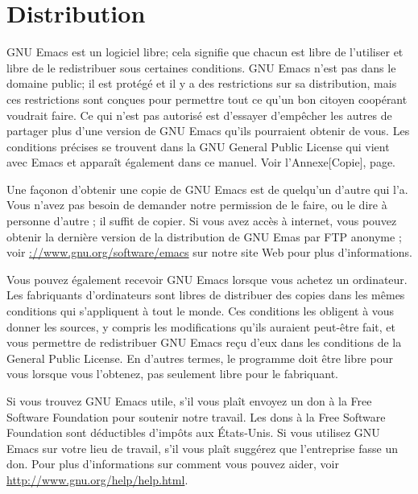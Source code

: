 {}
\section*{Distribution}\label{distribution}
GNU Emacs est un logiciel libre; cela signifie que chacun est libre de
l'utiliser et libre de le redistribuer sous certaines conditions. GNU
Emacs n'est pas dans le domaine public; il est protégé et il y a des
restrictions sur sa distribution, mais ces restrictions sont conçues
pour permettre tout ce qu'un bon citoyen coopérant voudrait faire. Ce
qui n'est pas autorisé est d'essayer d'empêcher les autres de partager
plus d'une version de GNU Emacs qu'ils pourraient obtenir de vous. Les
conditions précises se trouvent dans la GNU General Public License qui
vient avec Emacs et apparaît également dans ce manuel. Voir
l'Annexe[Copie], page.\par 

Une façonon d'obtenir une copie de GNU Emacs est de quelqu'un d'autre
qui l'a. Vous n'avez pas besoin de demander notre permission de le
faire, ou le dire à personne d'autre ; il suffit de copier. Si vous
avez accès à internet, vous pouvez obtenir la dernière version de la
distribution de GNU Emas par FTP anonyme ; voir
\url{://www.gnu.org/software/emacs} sur notre site Web pour plus
d'informations. \par

Vous pouvez également recevoir GNU Emacs lorsque vous achetez un
ordinateur. Les fabriquants d'ordinateurs sont libres de distribuer
des copies dans les mêmes conditions qui s'appliquent à tout le
monde. Ces conditions les obligent à vous donner les sources, y
compris les modifications qu'ils auraient peut-être fait, et vous
permettre de redistribuer GNU Emacs reçu d'eux dans les conditions de
la General Public License. En d'autres termes, le programme doit être
libre pour vous lorsque vous l'obtenez, pas seulement libre pour le
fabriquant. \par

Si vous trouvez GNU Emacs utile, s'il vous plaît envoyez un don à la
Free Software Foundation pour soutenir notre travail. Les dons à la Free
Software Foundation sont déductibles d'impôts aux \'Etats-Unis. Si
vous utilisez GNU Emacs sur votre lieu de travail, s'il vous plaît
suggérez que l'entreprise fasse un don. Pour plus d'informations sur
comment vous pouvez aider, voir
\url{http://www.gnu.org/help/help.html}.\par

